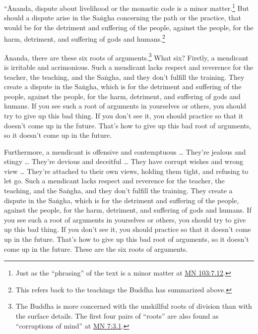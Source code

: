 \documentclass[12pt,openany]{book}%
\begin{document}
“Ānanda, dispute about livelihood or the monastic code is a minor matter.\footnote{Just as the “phrasing” of the text is a minor matter at \href{https://suttacentral.net/mn103/en/sujato\#7.12}{MN 103:7.12}. } But should a dispute arise in the \textsanskrit{Saṅgha} concerning the path or the practice, that would be for the detriment and suffering of the people, against the people, for the harm, detriment, and suffering of gods and humans.\footnote{This refers back to the teachings the Buddha has summarized above. } 

Ānanda, there are these six roots of arguments.\footnote{The Buddha is more concerned with the unskillful roots of division than with the surface details. The first four pairs of “roots” are also found as “corruptions of mind” at \href{https://suttacentral.net/mn7/en/sujato\#3.1}{MN 7:3.1}. } What six? Firstly, a mendicant is irritable and acrimonious. Such a mendicant lacks respect and reverence for the teacher, the teaching, and the \textsanskrit{Saṅgha}, and they don’t fulfill the training. They create a dispute in the \textsanskrit{Saṅgha}, which is for the detriment and suffering of the people, against the people, for the harm, detriment, and suffering of gods and humans. If you see such a root of arguments in yourselves or others, you should try to give up this bad thing. If you don’t see it, you should practice so that it doesn’t come up in the future. That’s how to give up this bad root of arguments, so it doesn’t come up in the future. 

Furthermore, a mendicant is offensive and contemptuous … They’re jealous and stingy … They’re devious and deceitful … They have corrupt wishes and wrong view … They’re attached to their own views, holding them tight, and refusing to let go. Such a mendicant lacks respect and reverence for the teacher, the teaching, and the \textsanskrit{Saṅgha}, and they don’t fulfill the training. They create a dispute in the \textsanskrit{Saṅgha}, which is for the detriment and suffering of the people, against the people, for the harm, detriment, and suffering of gods and humans. If you see such a root of arguments in yourselves or others, you should try to give up this bad thing. If you don’t see it, you should practice so that it doesn’t come up in the future. That’s how to give up this bad root of arguments, so it doesn’t come up in the future. These are the six roots of arguments. 
\end{document}
